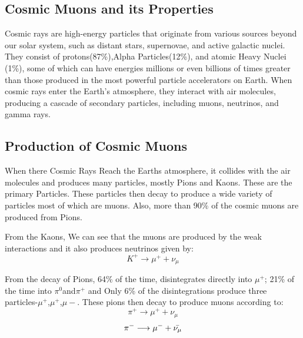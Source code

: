 \documentclass{article}
\begin{document}
\begin{multicols}{2}



\section{Cosmic Muons and its Properties}



Cosmic rays are high-energy particles that originate from various sources beyond our 
solar system, such as distant stars, supernovae, and active galactic nuclei. They consist of 
protons(87\%),Alpha Particles(12\%), and atomic Heavy Nuclei (1\%), some of which can have energies millions or even billions 
of times greater than those produced in the most powerful particle accelerators on Earth. When 
cosmic rays enter the Earth's atmosphere, they interact with air molecules, producing a cascade 
of secondary particles, including muons, neutrinos, and gamma rays.

\subsection{Production of Cosmic Muons}\label{muonproduction}
When there Cosmic Rays Reach the Earths atmosphere, it collides with the air molecules and produces 
many particles, mostly Pions and Kaons. These are the primary Particles. These particles then decay to produce a wide variety
of particles most of which are muons. Also, more than 90\% of the cosmic muons are produced from Pions.

From the Kaons, We can see that the muons are produced by the weak interactions and it also produces neutrinos given by:
\begin{equation}
    K^{+} \longrightarrow \mu^{+} + \nu_{\mu}
\end{equation}

From the decay of Pions, 64\% of the time, disintegrates directly into $\mu^+$; 21\% of the time into $\pi^0$and$\pi^+$ and Only 6\% of the disintegrations produce three particles-$\mu^+$,$\mu^+$,$\mu-$. These pions then decay to produce muons according to:
\begin{equation}
    \pi^{+} \longrightarrow \mu^{+} + \nu_{\mu}
\end{equation}
\begin{equation}
    \pi^{-} \longrightarrow \mu^{-} + \Bar{\nu_{\mu}}
\end{equation}




\end{multicols}
\end{document}
